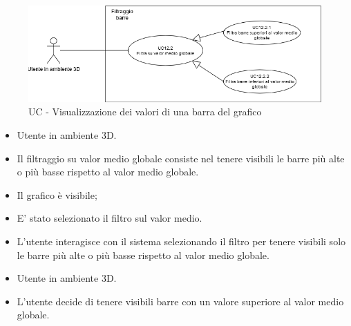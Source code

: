 \begin{figure}[h!]\centering
    \includegraphics[scale=0.7]{template/images/UC12.2.png}
    \caption{UC - Visualizzazione dei valori di una barra del grafico}
\end{figure}
\UCdsc
{ %
    \begin{itemize}
        \item Utente in ambiente 3D.
    \end{itemize}
}
{ %
    \begin{itemize}
        \item Il filtraggio su valor medio globale consiste nel tenere visibili le barre più alte o più basse rispetto al valor medio globale.
    \end{itemize}
}
{ %
    \begin{itemize}
        \item Il grafico è visibile;
    \end{itemize}
}
{ %
    \begin{itemize}
        \item E' stato selezionato il filtro sul valor medio.
    \end{itemize}
}
{ %
    \begin{itemize}
        \item L'utente interagisce con il sistema selezionando il filtro per tenere visibili solo le barre più alte o più basse rispetto al valor medio globale.
    \end{itemize}
}
\UCdsc
{ %
    \begin{itemize}
        \item Utente in ambiente 3D.
    \end{itemize}
}
{ %
    \begin{itemize}
        \item L'utente decide di tenere visibili barre con un valore superiore al valor medio globale.
    \end{itemize}
}

